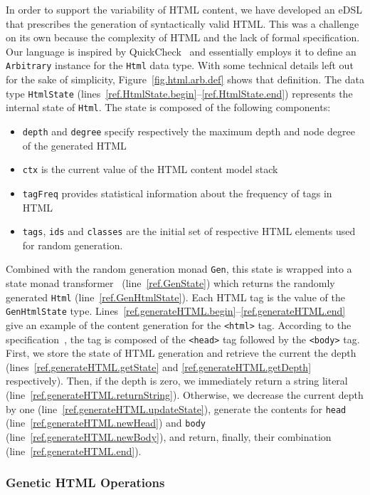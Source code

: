 In order to support the variability of HTML content, we have developed an eDSL that prescribes the generation of syntactically valid HTML. This was a challenge on its own because the complexity of HTML and the lack of formal specification. Our language is inspired by QuickCheck~\cite{claessen2011quickcheck} and essentially employs it to define an \texttt{Arbitrary} instance for the \texttt{Html} data type. With some technical details left out for the sake of simplicity, Figure~\ref{fig.html.arb.def} shows that definition. The data type \texttt{HtmlState} (lines~\ref{ref.HtmlState.begin}--\ref{ref.HtmlState.end}) represents the internal state of \texttt{Html}. The state is composed of the following components:
\begin{itemize}
\item \texttt{depth} and \texttt{degree} specify respectively the maximum depth and node degree of the generated HTML
\item \texttt{ctx} is the current value of the HTML content model stack
\item \texttt{tagFreq} provides statistical information about the frequency of tags in HTML
\item \texttt{tags}, \texttt{ids} and \texttt{classes} are the initial set of respective HTML elements used for random generation.
\end{itemize}
Combined with the random generation monad \texttt{Gen}, this state is wrapped into a state monad transformer~\cite{jones1995functional} (line~\ref{ref.GenState}) which returns the randomly generated \texttt{Html} (line~\ref{ref.GenHtmlState}). Each HTML tag is the value of the \texttt{GenHtmlState} type. Lines~\ref{ref.generateHTML.begin}--\ref{ref.generateHTML.end} give an example of the content generation for the \texttt{<html>} tag. According to the specification~\cite{htmlspec}, the tag is composed of the \texttt{<head>} tag followed by the \texttt{<body>} tag. First, we store the state of HTML generation and retrieve the current the depth (lines~\ref{ref.generateHTML.getState} and \ref{ref.generateHTML.getDepth} respectively). Then, if the depth is zero, we immediately return a string literal (line~\ref{ref.generateHTML.returnString}). Otherwise, we decrease the current depth by one (line~\ref{ref.generateHTML.updateState}), generate the contents for \texttt{head} (line~\ref{ref.generateHTML.newHead}) and \texttt{body} (line~\ref{ref.generateHTML.newBody}), and return, finally, their combination (line~\ref{ref.generateHTML.end}).

\subsubsection{Genetic HTML Operations}
\label{sub.sub.sec.genetic.oper}

